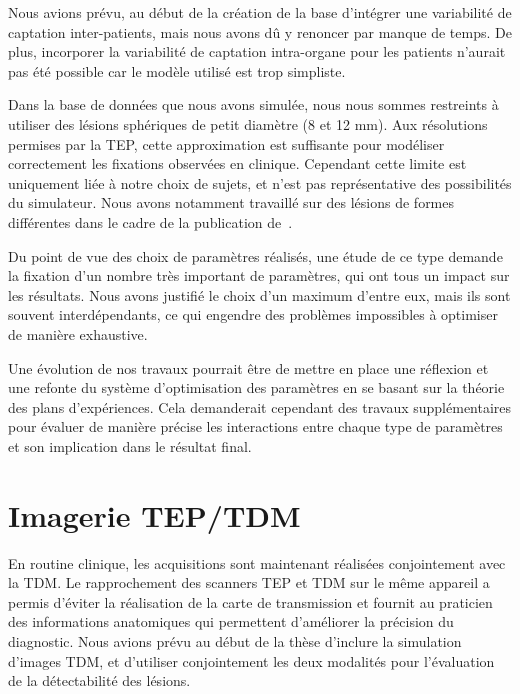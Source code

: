 Nous avions prévu, au début de la création de la base d'intégrer une variabilité
de captation inter-patients, mais nous avons dû y renoncer par manque de temps.
De plus, incorporer la variabilité de captation intra-organe pour les patients
n'aurait pas été possible car le modèle utilisé est trop simpliste.  

Dans la base de données que nous avons simulée, nous nous sommes restreints à
utiliser des lésions sphériques de petit diamètre (8 et 12 mm). Aux résolutions
permises par la TEP, cette approximation est suffisante pour modéliser
correctement les fixations observées en clinique. Cependant cette limite est
uniquement liée à notre choix de sujets, et n'est pas représentative des
possibilités du simulateur. Nous avons notamment travaillé sur des lésions de
formes différentes dans le cadre de la publication
de~\cite{le2009incorporating}.  


Du point de vue des choix de paramètres réalisés, une étude de
ce type demande la fixation d'un nombre très important de
paramètres, qui ont tous un impact sur les résultats. Nous avons justifié le
choix d'un maximum d'entre eux, mais ils sont souvent interdépendants, ce qui
engendre des problèmes impossibles à optimiser de manière exhaustive.  

Une évolution de nos travaux pourrait être de mettre en place une réflexion et
une refonte du système d'optimisation des paramètres en se basant sur la théorie
des plans d'expériences. Cela demanderait cependant des travaux supplémentaires
pour évaluer de manière précise les interactions entre chaque type de paramètres
et son implication dans le résultat final. 


\section{Imagerie TEP/TDM}

En routine clinique, les acquisitions sont maintenant réalisées conjointement
avec la TDM. Le rapprochement des scanners TEP et TDM sur le même appareil a
permis d'éviter la réalisation de la carte de transmission et fournit au
praticien des informations anatomiques qui permettent d'améliorer la précision
du diagnostic. Nous avions prévu au début de la thèse d'inclure la simulation
d'images TDM, et d'utiliser conjointement les deux modalités pour l'évaluation
de la détectabilité des lésions.  

